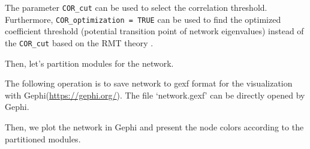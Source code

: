 \documentclass[
]{book}
\newenvironment{Shaded}{\begin{snugshade}}{\end{snugshade}}
\newcommand{\AttributeTok}[1]{\textcolor[rgb]{0.13,0.29,0.53}{#1}}
\newcommand{\CommentTok}[1]{\textcolor[rgb]{0.56,0.35,0.01}{\textit{#1}}}
\newcommand{\ConstantTok}[1]{\textcolor[rgb]{0.56,0.35,0.01}{#1}}
\newcommand{\FloatTok}[1]{\textcolor[rgb]{0.00,0.00,0.81}{#1}}
\newcommand{\FunctionTok}[1]{\textcolor[rgb]{0.13,0.29,0.53}{\textbf{#1}}}
\newcommand{\NormalTok}[1]{#1}
\newcommand{\SpecialCharTok}[1]{\textcolor[rgb]{0.81,0.36,0.00}{\textbf{#1}}}
\newcommand{\StringTok}[1]{\textcolor[rgb]{0.31,0.60,0.02}{#1}}
\begin{document}
The parameter \texttt{COR\_cut} can be used to select the correlation threshold.
Furthermore, \texttt{COR\_optimization\ =\ TRUE} can be used to find the optimized coefficient threshold (potential transition point of network eigenvalues)
instead of the \texttt{COR\_cut} based on the RMT theory \citep{Deng_Molecular_2012}.

\begin{Shaded}
\end{Shaded}

Then, let's partition modules for the network.

\begin{Shaded}
\end{Shaded}

The following operation is to save network to gexf format for the visualization with Gephi(\url{https://gephi.org/}).
The file `network.gexf' can be directly opened by Gephi.

\begin{Shaded}
\end{Shaded}

Then, we plot the network in Gephi and present the node colors according to the partitioned modules.
\end{document}
